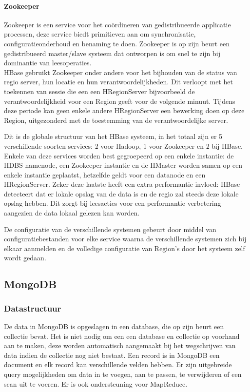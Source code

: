 \paragraph{Zookeeper\cite{hunt2010zookeeper}} Zookeeper is een service voor het coördineren van gedistribueerde applicatie processen, deze service biedt primitieven aan om synchronisatie, configuratieonderhoud en benaming te doen. Zookeeper is op zijn beurt een gedistribueerd master/slave systeem dat ontworpen is om snel te zijn bij dominantie van leesoperaties.  \\
HBase gebruikt Zookeeper onder andere voor het bijhouden van de status van regio server, hun locatie en hun verantwoordelijkheden. Dit verloopt met het toekennen van sessie die een een HRegionServer bijvoorbeeld de verantwoordelijkheid voor een Region geeft voor de volgende minuut. Tijdens deze periode kan geen enkele andere HRegionServer een bewerking doen op deze Region, uitgezonderd met de toestemming van de verantwoordelijke server. \cite{george2011hbase} 



Dit is de globale structuur van het HBase systeem, in het totaal zijn er 5 verschillende soorten services: 2 voor Hadoop, 1 voor Zookeeper en 2 bij HBase. Enkele van deze services worden best gegroepeerd op een enkele instantie: de HDBS namenode, een Zookeeper instantie en de HMaster worden samen op een enkele instantie geplaatst, hetzelfde geldt voor een datanode en een HRegionServer. Zeker deze laatste heeft een extra performantie invloed: HBase detecteert dat er lokale opslag van de data is en de regio zal steeds deze lokale opslag hebben. Dit zorgt bij leesacties voor een performantie verbetering aangezien de data lokaal gelezen kan worden.

De configuratie van de verschillende systemen gebeurt door middel van configuratiebestanden voor elke service waarna de verschillende systemen zich bij elkaar aanmelden en de volledige configuratie van Region's door het systeem zelf wordt gedaan.  

\subsection{MongoDB\cite{mongodb-manual}}

\subsubsection{Datastructuur}
De data in MongoDB is opgeslagen in een database, die op zijn beurt een collectie bevat. Het is niet nodig om een een database en collectie op voorhand aan te maken, deze worden automatisch aangemaakt bij het wegschrijven van data indien de collectie nog niet bestaat. Een record is in MongoDB een document en elk record kan verschillende velden hebben. Er zijn uitgebreide query mogelijkheden om data in te voegen, aan te passen, te verwijderen of een scan uit te voeren. Er is ook ondersteuning voor MapReduce\cite{dean2008mapreduce}. 

